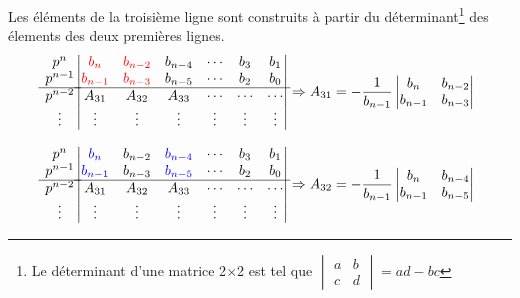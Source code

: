 Les éléments de la troisième ligne sont construits à partir du 
déterminant\footnote{Le déterminant d'une matrice 2$\times$2 
est tel que $\begin{vmatrix} a & b \\ c & d \end{vmatrix}=ad-bc$} des 
élements des deux premières lignes.
\[
\begin{matrix}
    p^n    \\
    p^{n-1}\\
    \hline
    p^{n-2}\\
    \vdots \\
\end{matrix}
\begin{vmatrix}
    \textcolor{red}{b_n}       & \textcolor{red}{b_{n-2}}    & b_{n-4}    
                               & \cdots & b_3            & b_1         \\
    \textcolor{red}{b_{n-1}}   & \textcolor{red}{b_{n-3}}    & b_{n-5}    
                               & \cdots & b_2            & b_0         \\
    \hline
    A_{31}  & A_{32}     & A_{33}     & \cdots & \cdots         & \cdots   \\
    \vdots    & \vdots     & \vdots     & \vdots & \vdots         & \vdots \\
\end{vmatrix}
\Rightarrow
A_{31}=-\dfrac{1}{b_{n-1}}
\begin{vmatrix} b_{n}  & b_{n-2} \\ b_{n-1} & b_{n-3}
\end{vmatrix}
\]

\[
\begin{matrix}
    p^n    \\
    p^{n-1}\\
    \hline
    p^{n-2}\\
    \vdots \\
\end{matrix}
\begin{vmatrix}
    \textcolor{blue}{b_n}       & b_{n-2}    & \textcolor{blue}{b_{n-4}}    
    & \cdots & b_3        & b_1         \\
    \textcolor{blue}{b_{n-1}}   & b_{n-3}    & \textcolor{blue}{b_{n-5}}    
    & \cdots & b_2            & b_0         \\
    \hline
    A_{31}    & A_{32}     & A_{33}     & \cdots & \cdots         & \cdots  \\
    \vdots    & \vdots     & \vdots     & \vdots & \vdots         & \vdots  \\
\end{vmatrix}
\Rightarrow
A_{32}=-\dfrac{1}{b_{n-1}}\begin{vmatrix} b_{n}  & b_{n-4} \\ b_{n-1} & b_{n-5}
\end{vmatrix}
\]

